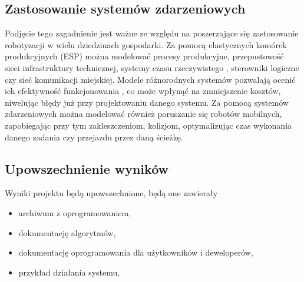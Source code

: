 \documentclass[10pt, a4paper]{article}
\begin{document}
\subsection{Zastosowanie systemów zdarzeniowych}
Podjęcie tego zagadnienie jest ważne ze względu na poszerzające się zastosowanie robotyzacji w wielu dziedzinach gospodarki. Za pomocą elastycznych komórek produkcyjnych (ESP) można modelować procesy produkcyjne, przepustowość sieci infrastruktury technicznej, systemy czasu rzeczywistego  \cite{scr} , sterowniki logiczne \cite{sl} czy sieć komunikacji miejskiej. Modele różnorodnych systemów pozwalają ocenić ich efektywność funkcjonowania \cite{mucha}, co może wpłynąć na zmniejszenie kosztów, niwelując błędy już przy projektowaniu danego systemu. Za pomocą systemów zdarzeniowych można modelować również poruszanie się robotów mobilnych, zapobiegając przy tym zakleszczeniom, kolizjom, optymalizując czas wykonania danego zadania czy przejazdu przez daną ścieżkę.

\subsection{Upowszechnienie wyników}

Wyniki projektu będą upowszechnione, będą one zawierały
\begin{itemize}
\item archiwum z oprogramowaniem,
\item dokumentację algorytmów,
\item dokumentację oprogramowania dla użytkowników i deweloperów,
\item przykład działania systemu,
\end{itemize}
\end{document}

